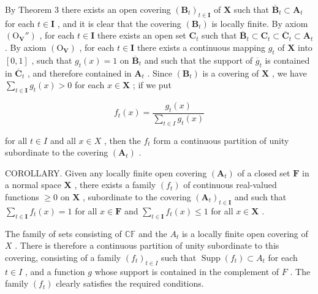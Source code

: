By Theorem 3 there exists an open covering \((\mathbf{B}_t)_{t \in \mathbf{I}}\) of \(\mathbf{X}\) such that \(\overline{\mathbf{B}}_t \subset \mathbf{A}_t\) for each \(t \in \mathbf{I}\) , and it is clear that the covering \((\mathbf{B}_t)\) is locally finite. By axiom \((\mathrm{O}_{\mathbf{V}}'')\) , for each \(t \in \mathbf{I}\) there exists an open set \(\mathbf{C}_t\) such that \(\overline{\mathbf{B}}_t \subset \mathbf{C}_t \subset \overline{\mathbf{C}}_t \subset \mathbf{A}_t\) . By axiom \((\mathrm{O}_{\mathbf{V}})\) , for each \(t \in \mathbf{I}\) there exists a continuous mapping \(g_t\) of \(\mathbf{X}\) into \([0,1]\) , such that \(g_t(x) = 1\) on \(\overline{\mathbf{B}}_t\) and such that the support of \(\overline{g}_t\) is contained in \(\overline{\mathbf{C}}_t\) , and therefore contained in \(\mathbf{A}_t\) . Since \((\mathbf{B}_t)\) is a covering of \(\mathbf{X}\) , we have \(\sum_{t \in \mathbf{I}} g_t(x) > 0\) for each \(x \in \mathbf{X}\) ; if we put

\[
f _ {t} (x) = \frac {g _ {t} (x)}{\sum_ {t \in I} g _ {t} (x)}
\]

for all \(t \in I\) and all \(x \in X\) , then the \(f_t\) form a continuous partition of unity subordinate to the covering \((\mathbf{A}_t)\) .

COROLLARY. Given any locally finite open covering \((\mathbf{A}_t)\) of a closed set \(\mathbf{F}\) in a normal space \(\mathbf{X}\) , there exists a family \((f_t)\) of continuous real-valued functions \(\geqslant 0\) on \(\mathbf{X}\) , subordinate to the covering \((\mathbf{A}_t)_{t \in \mathbf{I}}\) and such that \(\sum_{t \in \mathbf{I}} f_t(x) = 1\) for all \(x \in \mathbf{F}\) and \(\sum_{t \in \mathbf{I}} f_t(x) \leqslant 1\) for all \(x \in \mathbf{X}\) .

The family of sets consisting of \(\mathbb{CF}\) and the \(A_{t}\) is a locally finite open covering of \(X\) . There is therefore a continuous partition of unity subordinate to this covering, consisting of a family \((f_{t})_{t\in I}\) such that \(\operatorname{Supp}(f_t)\subset A_t\) for each \(t\in I\) , and a function \(g\) whose support is contained in the complement of \(F\) . The family \((f_{t})\) clearly satisfies the required conditions.

